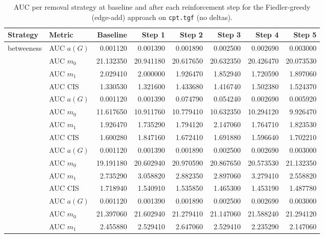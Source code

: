 \begin{table}[htbp]
  \centering
  \caption{AUC per removal strategy at baseline and after each reinforcement step for the Fiedler-greedy (edge-add) approach on \texttt{cpt.tgf} (no deltas).}
  \label{tab:cpt-fiedler_greedy-auc}
  \begin{tabular}{llrrrrrr}
    \toprule
    \textbf{Strategy} & \textbf{Metric} & \textbf{Baseline} & \textbf{Step 1} & \textbf{Step 2} & \textbf{Step 3} & \textbf{Step 4} & \textbf{Step 5} \\
    \midrule
    \multirow{4}{*}{betweeness} & AUC $a(G)$ & 0.001120 & 0.001390 & 0.001890 & 0.002500 & 0.002690 & 0.003000 \\
    & AUC $m_0$ & 21.132350 & 20.941180 & 20.617650 & 20.632350 & 20.426470 & 20.073530 \\
    & AUC $m_1$ & 2.029410 & 2.000000 & 1.926470 & 1.852940 & 1.720590 & 1.897060 \\
    & AUC CIS & 1.330530 & 1.321600 & 1.433680 & 1.416740 & 1.502380 & 1.524370 \\
    \addlinespace
    \multirow{4}{*}{closeness} & AUC $a(G)$ & 0.001120 & 0.001390 & 0.074790 & 0.054240 & 0.002690 & 0.005920 \\
    & AUC $m_0$ & 11.617650 & 10.911760 & 10.779410 & 10.632350 & 10.294120 & 9.926470 \\
    & AUC $m_1$ & 1.926470 & 1.735290 & 1.794120 & 2.147060 & 1.764710 & 1.823530 \\
    & AUC CIS & 1.600280 & 1.847160 & 1.672410 & 1.691880 & 1.596640 & 1.702210 \\
    \addlinespace
    \multirow{4}{*}{core influence} & AUC $a(G)$ & 0.001120 & 0.001390 & 0.001890 & 0.002500 & 0.002690 & 0.003000 \\
    & AUC $m_0$ & 19.191180 & 20.602940 & 20.970590 & 20.867650 & 20.573530 & 21.132350 \\
    & AUC $m_1$ & 2.735290 & 3.058820 & 2.882350 & 2.897060 & 3.279410 & 2.558820 \\
    & AUC CIS & 1.718940 & 1.540910 & 1.535850 & 1.465300 & 1.453190 & 1.487780 \\
    \addlinespace
    \multirow{4}{*}{degree} & AUC $a(G)$ & 0.001120 & 0.001390 & 0.001890 & 0.002500 & 0.002690 & 0.003000 \\
    & AUC $m_0$ & 21.397060 & 21.602940 & 21.279410 & 21.147060 & 21.588240 & 21.294120 \\
    & AUC $m_1$ & 2.455880 & 2.529410 & 2.647060 & 2.529410 & 2.235290 & 2.147060 \\

\end{tabular}
\end{table}
